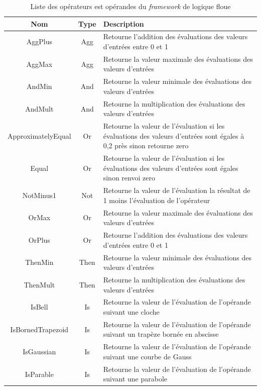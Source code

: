 \documentclass[a4paper,11pt]{article}
\begin{document}
    \begin{table}[H]
        \caption{Liste des opérateurs est opérandes du \textit{framework} de logique floue}
        \label{tab:listing}

        \begin{center}
            \begin{tabular}{|c|c|M{12cm}|}
                \hline
                Nom & Type & Description \tabularnewline
                \hline
                AggPlus & Agg & Retourne l'addition des évaluations des valeurs d'entrées entre 0 et 1\tabularnewline
                \hline
                AggMax & Agg & Retourne la valeur maximale des évaluations des valeurs d'entrées\tabularnewline
                \hline
                AndMin & And & Retourne la valeur minimale des évaluations des valeurs d'entrées\tabularnewline
                \hline
                AndMult & And & Retourne la multiplication des évaluations des valeurs d'entrées\tabularnewline
                \hline
                ApproximatelyEqual & Or & Retourne la valeur de l'évaluation si les évaluations des valeurs d'entrées sont égales à 0,2 près sinon retourne zero\tabularnewline
                \hline
                Equal & Or & Retourne la valeur de l'évaluation si les évaluations des valeurs d'entrées sont égales sinon renvoi zero\tabularnewline
                \hline
                NotMinus1 & Not & Retourne la valeur de l'évaluation la résultat de 1 moins l'évaluation de l'opérateur\tabularnewline
                \hline
                OrMax & Or & Retourne la valeur maximale des évaluations des valeurs d'entrées\tabularnewline
                \hline
                OrPlus & Or & Retourne l'addition des évaluations des valeurs d'entrées entre 0 et 1\tabularnewline
                \hline
                ThenMin & Then & Retourne la valeur minimale des évaluations des valeurs d'entrées\tabularnewline
                \hline
                ThenMult & Then & Retourne la multiplication des évaluations des valeurs d'entrées\tabularnewline
                \hline
                IsBell & Is & Retourne la valeur de l'évaluation de l'opérande suivant une cloche \tabularnewline
                \hline
                IsBornedTrapezoid & Is & Retourne la valeur de l'évaluation de l'opérande suivant un trapèze bornée en abscisse \tabularnewline
                \hline
                IsGaussian & Is & Retourne la valeur de l'évaluation de l'opérande suivant une courbe de Gauss \tabularnewline
                \hline
                IsParable & Is & Retourne la valeur de l'évaluation de l'opérande suivant une parabole \tabularnewline

\end{tabular}
\end{center}
\end{table}
\end{document}
